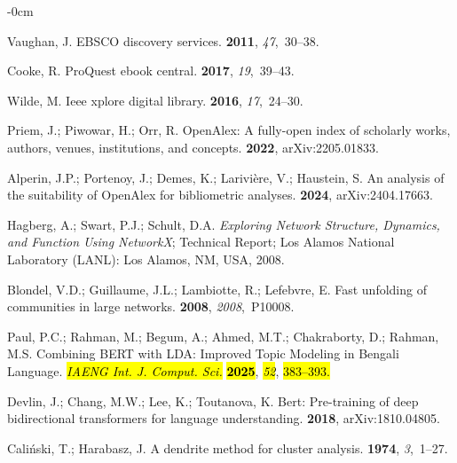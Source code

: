 \documentclass[jmse,review,accept,pdftex,moreauthors]{Definitions/mdpi}
\begin{document}
\begin{adjustwidth}{-\extralength}{0cm}
\begin{thebibliography}{999}
Vaughan, J.
\newblock EBSCO discovery services.
 {\bf 2011}, {\em 47},~30--38.

Cooke, R.
\newblock ProQuest ebook central.
 {\bf 2017}, {\em 19},~39--43.

Wilde, M.
\newblock Ieee xplore digital library.
 {\bf 2016}, {\em 17},~24--30.

Priem, J.; Piwowar, H.; Orr, R.
\newblock OpenAlex: A fully-open index of scholarly works, authors, venues,
  institutions, and concepts.
 {\bf 2022}, arXiv:2205.01833.

Alperin, J.P.; Portenoy, J.; Demes, K.; Larivi{\`e}re, V.; Haustein, S.
\newblock An analysis of the suitability of OpenAlex for bibliometric analyses.
 {\bf 2024}, arXiv:2404.17663.

Hagberg, A.; Swart, P.J.; Schult, D.A.
\newblock \emph{Exploring Network Structure, Dynamics, and Function Using NetworkX};
\newblock Technical Report; Los Alamos National Laboratory (LANL): Los Alamos,
  NM, USA, 2008.

Blondel, V.D.; Guillaume, J.L.; Lambiotte, R.; Lefebvre, E.
\newblock Fast unfolding of communities in large networks.
 {\bf
  2008}, {\em 2008},~P10008.

Paul, P.C.; Rahman, M.; Begum, A.; Ahmed, M.T.; Chakraborty, D.; Rahman, M.S.
\newblock Combining BERT with LDA: Improved Topic Modeling in Bengali Language. \emph{\hl{IAENG Int. J. Comput. Sci.}} \textbf{\hl{2025}}, \emph{\hl{52}}, \hl{383--393.}

Devlin, J.; Chang, M.W.; Lee, K.; Toutanova, K.
\newblock Bert: Pre-training of deep bidirectional transformers for language
  understanding.
 {\bf 2018}, arXiv:1810.04805.

Cali{\'n}ski, T.; Harabasz, J.
\newblock A dendrite method for cluster analysis.
 {\bf 1974},
  {\em 3},~1--27.


\end{thebibliography}
\end{adjustwidth}
\end{document}
